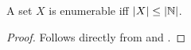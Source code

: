 \begin{theorem}\label{thm:card-enumerable} A set $X$ is enumerable iff
$\mathopen{}\left|{X}\right|\mathclose{}\leq\mathopen{}\left|{\mathbb{N}}\right|\mathclose{}$.  \end{theorem}

\begin{proof} Follows directly from  and .
\end{proof}






















